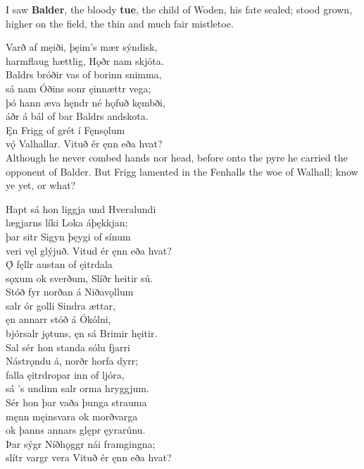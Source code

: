 I saw \textbf{Balder}, the bloody \textbf{tue}, the child of Woden, his fate sealed; stood grown, higher on the field, the thin and much fair mistletoe.

\bva Varð af męiði, \hld þęim's mær sýndisk, \\%
harmflaug hættlig, \hld Hǫðr nam skjóta. \\%
Baldrs bróðir vas \hld of borinn snimma, \\%
sá nam Óðins sonr \hld ęinnættr vega;\\%

\bva þó hann æva hęndr \hld né hǫfuð kęmbði, \\%
áðr á bál of bar \hld Baldrs andskota. \\%
Ęn Frigg of grét \hld í Fęnsǫlum \\%
vǫ́ Valhallar. \hld Vituð ér ęnn eða hvat?\\%

Although he never combed hands nor head, before onto the pyre he carried the opponent of Balder. But Frigg lamented in the Fenhalls the woe of Walhall; know ye yet, or what?

\bva Hapt sá hon liggja \hld und Hveralundi \\%
lægjarns líki \hld Loka áþękkjan; \\%
þar sitr Sigyn \hld þęygi of sínum \\%
veri vęl glýjuð. \hld Vitud ér ęnn eða hvat?\\%

\bva Ǫ́ fęllr austan \hld of ęitrdala \\%
sǫxum ok sverðum, \hld Slíðr heitir sú.\\%

\bva Stóð fyr norðan \hld á Niðavǫllum \\%
salr ór golli \hld Sindra ættar, \\%
ęn annarr stóð \hld á Ókólni, \\%
bjórsalr jǫtuns, \hld ęn sá Brimir hęitir.\\%

\bva Sal sér hon standa \hld sólu fjarri \\%
Nástrǫndu á, \hld norðr horfa dyrr; \\%
falla ęitrdropar \hld inn of ljóra, \\%
sá ’s undinn salr \hld orma hryggjum.\\%

\bva Sér hon þar vaða \hld þunga strauma \\%
męnn męinsvara \hld ok morðvarga \\%
ok þanns annars glępr \hld ęyrarúnu. \\%
Þar sýgr Níðhǫggr \hld nái framgingna; \\%
slítr vargr vera \hld Vituð ér ęnn eða hvat?\\%

